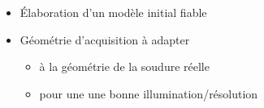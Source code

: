 \begin{frame}{\insertsectionhead}
\begin{itemize}
\begin{figure}[!h]
		\end{figure}	
		\item<3-> Élaboration d'un modèle initial fiable 
		\item<4-> Géométrie d'acquisition à adapter
			\begin{itemize}
				\item à la géométrie de la soudure réelle
				\item pour une une bonne illumination/résolution
			\end{itemize}
	\end{itemize}
	
\end{frame}

